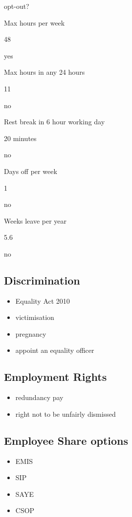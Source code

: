 opt-out?

Max hours per week

48

yes

Max hours in any 24 hours

11

no

Rest break in 6 hour working day

20 minutes

no

Days off per week

1

no

Weeks leave per year

5.6

no

\subsection{Discrimination}\label{discrimination}

\begin{itemize}
\itemsep1pt\parskip0pt
\item
  Equality Act 2010
\item
  victimisation
\item
  pregnancy
\item
  appoint an equality officer
\end{itemize}

\subsection{Employment Rights}\label{employment-rights}

\begin{itemize}
\itemsep1pt\parskip0pt
\item
  redundancy pay
\item
  right not to be unfairly dismissed
\end{itemize}

\subsection{Employee Share options}\label{employee-share-options}

\begin{itemize}
\itemsep1pt\parskip0pt
\item
  EMIS
\item
  SIP
\item
  SAYE
\item
  CSOP
\end{itemize}

